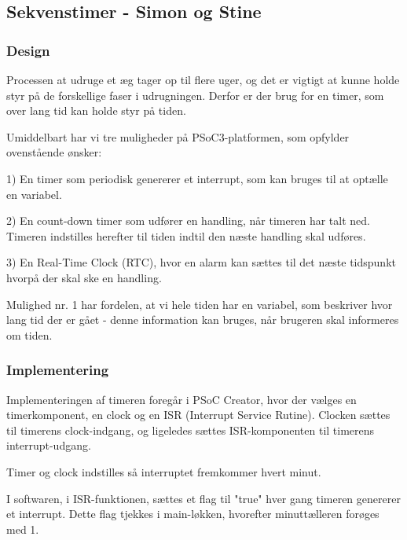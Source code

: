 \subsection{Sekvenstimer - Simon og Stine}

\subsubsection{Design}
Processen at udruge et æg tager op til flere uger, og det er vigtigt at kunne holde styr på de forskellige faser i udrugningen. Derfor er der brug for en timer, som over lang tid kan holde styr på tiden.

Umiddelbart har vi tre muligheder på PSoC3-platformen, som opfylder ovenstående ønsker:

1) En timer som periodisk genererer et interrupt, som kan bruges til at optælle en variabel.

2) En count-down timer som udfører en handling, når timeren har talt ned. Timeren indstilles herefter til tiden indtil den næste handling skal udføres.

3) En Real-Time Clock (RTC), hvor en alarm kan sættes til det næste tidspunkt hvorpå der skal ske en handling.

Mulighed nr. 1 har fordelen, at vi hele tiden har en variabel, som beskriver hvor lang tid der er gået - denne information kan bruges, når brugeren skal informeres om tiden.

\subsubsection{Implementering}
Implementeringen af timeren foregår i PSoC Creator, hvor der vælges en timerkomponent, en clock og en ISR (Interrupt Service Rutine). Clocken sættes til timerens clock-indgang, og ligeledes sættes ISR-komponenten til timerens interrupt-udgang.

Timer og clock indstilles så interruptet fremkommer hvert minut.

I softwaren, i ISR-funktionen, sættes et flag til "true" hver gang timeren genererer et interrupt. Dette flag tjekkes i main-løkken, hvorefter minuttælleren forøges med 1. 